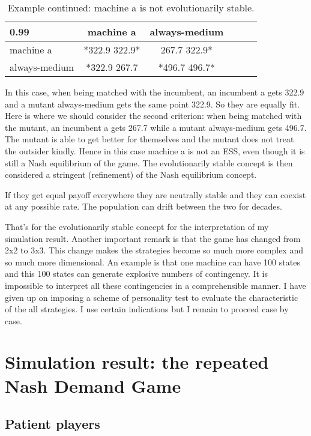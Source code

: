 \documentclass[12.5pt]{report}
\begin{document}
\begin{table}[h!]
\center
\begin{tabular}{l|ccccc}
\textbf{0.99}& machine a & always-medium \\
\hline
machine a & *322.9 322.9* &   267.7 322.9*   \\
always-medium  &  *322.9 267.7  &    *496.7 496.7*  \\
\end{tabular}
\caption{Example continued: machine a is not evolutionarily stable.}
\end{table}

In this case, when being matched with the incumbent, an incumbent a gets 322.9 and a mutant always-medium gets the same point 322.9. So they are equally fit. Here is where we should consider the second criterion: when being matched with the mutant, an incumbent a gets 267.7 while a mutant always-medium gets 496.7. The mutant is able to get better for themselves and the mutant does not treat the outsider kindly. Hence in this case machine a is not an ESS, even though it is still a Nash equilibrium of the game. The evolutionarily stable concept is then considered a stringent (refinement) of the Nash equilibrium concept.

If they get equal payoff everywhere they are neutrally stable and they can coexist at any possible rate. The population can drift between the two for decades.

That's for the evolutionarily stable concept for the interpretation of my simulation result. Another important remark is that the game has changed from 2x2 to 3x3. This change makes the strategies become so much more complex and so much more dimensional. An example is that one machine can have 100 states and this 100 states can generate explosive numbers of contingency. It is impossible to interpret all these contingencies in a comprehensible manner. I have given up on imposing a scheme of personality test to evaluate the characteristic of the all strategies. I use certain indications but I remain to proceed case by case.\\

\chapter{Simulation result: the repeated Nash Demand Game}
\section{Patient players}
\end{document}
